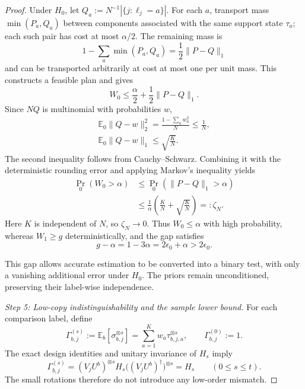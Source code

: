 \documentclass[aps,prx,reprint,superscriptaddress,amsmath,amssymb,longbibliography,floatfix]{revtex4-2}
\theoremstyle{plain}
\theoremstyle{definition}
\theoremstyle{remark}
\begin{document}
\begin{proof}
Under $H_0$, let $Q_a:=N^{-1}|\{j:\ell_j=a\}|$. For each $a$, transport mass $\min(P_a,Q_a)$ between components associated with the same support state $\tau_a$; each such pair has cost at most $\alpha/2$. The remaining mass is
\[
1-\sum_a\min(P_a,Q_a)=\frac12\|P-Q\|_1
\]
and can be transported arbitrarily at cost at most one per unit mass. This constructs a feasible plan and gives
\[
W_0\le\frac{\alpha}{2}+\frac12\|P-Q\|_1.
\]
Since $NQ$ is multinomial with probabilities $w$,
\[
\begin{gathered}
\mathbb E_0\|Q-w\|_2^2=\frac{1-\sum_aw_a^2}{N}\le\frac1N,\\ \mathbb E_0\|Q-w\|_1\le\sqrt{\frac KN}.
\end{gathered}
\]
The second inequality follows from Cauchy--Schwarz. Combining it with the deterministic rounding error and applying Markov's inequality yields
\begin{equation}
\begin{aligned}
\Pr_0(W_0>\alpha)&\le\Pr_0(\|P-Q\|_1>\alpha)\\
&\le\frac1\alpha\left(\frac KN+\sqrt{\frac KN}\right)=:\zeta_N.
\end{aligned}
\label{eq:app-wasserstein-null-gap-probability}
\end{equation}
Here $K$ is independent of $N$, so $\zeta_N\to0$. Thus $W_0\le\alpha$ with high probability, whereas $W_1\ge g$ deterministically, and the gap satisfies
\begin{equation}
g-\alpha=1-3\alpha=2\epsilon_0+\alpha>2\epsilon_0.
\label{eq:app-wasserstein-estimation-gap}
\end{equation}

This gap allows accurate estimation to be converted into a binary test, with only a vanishing additional error under $H_0$. The priors remain unconditioned, preserving their label-wise independence.

\emph{Step 5: Low-copy indistinguishability and the sample lower bound.} For each comparison label, define
\[
\Gamma_{b,j}^{(s)}:=\mathbb E_b[\sigma_{b,j}^{\otimes s}]=\sum_{a=1}^Kw_a\tau_{b,j,a}^{\otimes s},\qquad \Gamma_{b,j}^{(0)}:=1.
\]
The exact design identities and unitary invariance of $H_s$ imply
\begin{equation}
\Gamma_{b,j}^{(s)}=(V_jU^b)^{\otimes s}H_s\bigl((V_jU^b)^\dagger\bigr)^{\otimes s}=H_s\qquad(0\le s\le t).
\label{eq:app-wasserstein-low-copy-matching}
\end{equation}
The small rotations therefore do not introduce any low-order mismatch.


\end{proof}
\end{document}

